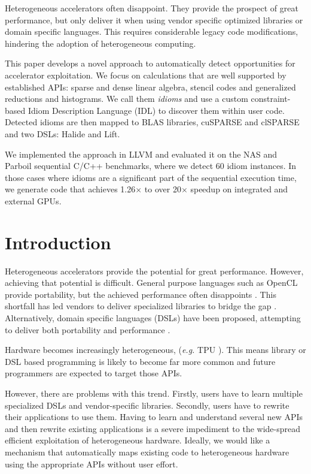 
    Heterogeneous accelerators often disappoint.
    They provide the prospect of great performance, but only deliver it when
    using vendor specific optimized libraries or domain specific languages.
    This requires considerable legacy code modifications, hindering the adoption
    of heterogeneous computing.

    This paper develops a novel approach to automatically detect opportunities
    for accelerator exploitation.
    We focus on calculations that are well supported by established APIs: sparse
    and dense linear algebra, stencil codes and generalized reductions and
    histograms.
    We call them {\em idioms} and use a custom constraint-based Idiom
    Description Language (IDL) to discover them within user code.
    Detected idioms are then mapped to BLAS libraries, cuSPARSE and clSPARSE and
    two DSLs: Halide and Lift.

    We implemented the approach in LLVM and evaluated it on the NAS and Parboil
    sequential C/C++ benchmarks, where we detect 60 idiom instances.
    In those cases where idioms are a significant part of the sequential
    execution time, we generate code that achieves 1.26$\times$ to over
    20$\times$ speedup on integrated and external GPUs.

\section{Introduction}

    Heterogeneous accelerators provide the potential for great performance.
    However, achieving that potential is difficult.
    General purpose languages such as OpenCL \cite{nvidia11guide} provide
    portability, but the achieved performance often disappoints
    \cite{lee09openmp}.
    This shortfall has led vendors to deliver specialized libraries to bridge
    the gap \cite{clblas}.  Alternatively, domain specific languages (DSLs)
    \cite{Franchetti09OL,Rompf:2012:LMS:2184319.2184345} have been proposed,
    attempting to deliver  both portability and performance
    \cite{Ragan-Kelley2013Halide}.

    Hardware becomes increasingly heterogeneous, ({\it e.g.} TPU
    \cite{jouppi2017datacenter}).
    This means library or DSL based programming is likely to become far more
    common and future programmers are expected to target those APIs.

    However, there are problems with this trend.
    Firstly, users have to learn multiple specialized DSLs and vendor-specific
    libraries.
    Secondly, users have to rewrite their applications to use them.
    Having to learn and understand several new APIs and then rewrite existing
    applications is a severe impediment to the wide-spread efficient
    exploitation of heterogeneous hardware.
    Ideally, we would like a mechanism that automatically maps existing code to
    heterogeneous hardware using the appropriate APIs without user effort.

